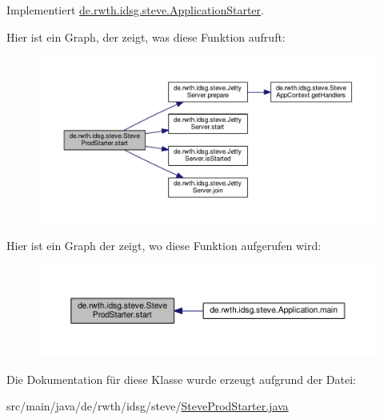 Implementiert \hyperlink{interfacede_1_1rwth_1_1idsg_1_1steve_1_1_application_starter_ad6461bffb2faebb821cadba517773b77}{de.\+rwth.\+idsg.\+steve.\+Application\+Starter}.



Hier ist ein Graph, der zeigt, was diese Funktion aufruft\+:\nopagebreak
\begin{figure}[H]
\begin{center}
\leavevmode
\includegraphics[width=350pt]{classde_1_1rwth_1_1idsg_1_1steve_1_1_steve_prod_starter_a406f74ba90a2381896db989b907cc947_cgraph}
\end{center}
\end{figure}




Hier ist ein Graph der zeigt, wo diese Funktion aufgerufen wird\+:\nopagebreak
\begin{figure}[H]
\begin{center}
\leavevmode
\includegraphics[width=350pt]{classde_1_1rwth_1_1idsg_1_1steve_1_1_steve_prod_starter_a406f74ba90a2381896db989b907cc947_icgraph}
\end{center}
\end{figure}




Die Dokumentation für diese Klasse wurde erzeugt aufgrund der Datei\+:\begin{DoxyCompactItemize}
\item 
src/main/java/de/rwth/idsg/steve/\hyperlink{_steve_prod_starter_8java}{Steve\+Prod\+Starter.\+java}\end{DoxyCompactItemize}
